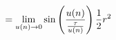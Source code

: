 \documentclass[preview]{standalone}
\begin{document}
\begin{align*}
= \lim_{u(n) \to 0} \sin \left( u(n) \over {\frac {\tau} {u(n)}}\right) \frac {1} {2} r^2
\end{align*}
\end{document}
